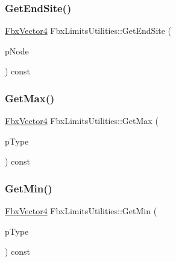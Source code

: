 \mbox{\label{class_fbx_limits_utilities_a0ec23f52b10360f82fd1670f984697dd}} 
\subsubsection{\texorpdfstring{Get\+End\+Site()}{GetEndSite()}}
{\footnotesize\ttfamily \hyperlink{class_fbx_vector4}{Fbx\+Vector4} Fbx\+Limits\+Utilities\+::\+Get\+End\+Site (\begin{DoxyParamCaption}\item[{\hyperlink{class_fbx_node}{Fbx\+Node} $\ast$}]{p\+Node }\end{DoxyParamCaption}) const}

\mbox{\label{class_fbx_limits_utilities_aa99f9ea9f9b1174d3971b63bc6a6e016}} 
\subsubsection{\texorpdfstring{Get\+Max()}{GetMax()}}
{\footnotesize\ttfamily \hyperlink{class_fbx_vector4}{Fbx\+Vector4} Fbx\+Limits\+Utilities\+::\+Get\+Max (\begin{DoxyParamCaption}\item[{\hyperlink{class_fbx_limits_utilities_aa55167751039b3d64b56cb7e58f2e62c}{E\+Type}}]{p\+Type }\end{DoxyParamCaption}) const}

\mbox{\label{class_fbx_limits_utilities_a17c96a6c202377bf7bea876d9c8a630b}} 
\subsubsection{\texorpdfstring{Get\+Min()}{GetMin()}}
{\footnotesize\ttfamily \hyperlink{class_fbx_vector4}{Fbx\+Vector4} Fbx\+Limits\+Utilities\+::\+Get\+Min (\begin{DoxyParamCaption}\item[{\hyperlink{class_fbx_limits_utilities_aa55167751039b3d64b56cb7e58f2e62c}{E\+Type}}]{p\+Type }\end{DoxyParamCaption}) const}

